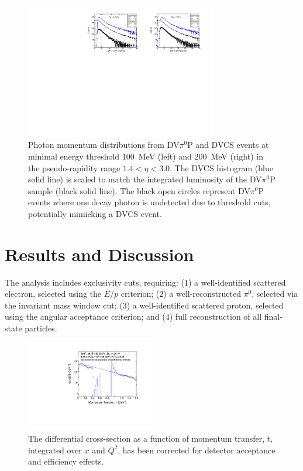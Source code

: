 \documentclass[letterpaper,12pt]{article}
\begin{document}
\begin{figure}[h]
    \centering
    \includegraphics[width=0.75\textwidth]{Figures/hGammasMomMC2DVCS.pdf}
    \caption{Photon momentum distributions from DV$\pi^{0}$P and DVCS events at minimal energy threshold 100~MeV (left) and 200~MeV (right) in the pseudo-rapidity range $1.4 < \eta < 3.0$. The DVCS histogram (blue solid line) is scaled to match the integrated luminosity of the DV$\pi^{0}$P sample (black solid line). The black open circles represent DV$\pi^{0}$P events where one decay photon is undetected due to threshold cuts, potentially mimicking a DVCS event.}
\label{fig:gamma_dist}
\end{figure}

\pagebreak
\section{Results and Discussion}\label{sec:Results_Discuss}
The analysis includes exclusivity cuts, requiring: (1) a well-identified scattered electron, selected using the $E/p$ criterion; (2) a well-reconstructed $\pi^{0}$, selected via the invariant mass window cut; (3) a well-identified scattered proton, selected using the angular acceptance criterion; and (4) full reconstruction of all final-state particles.

\begin{figure}[hb]
    \centering
    \includegraphics[width=0.5\textwidth]{Figures/t_distribution_corrected_sigma.pdf}
    \caption{The differential cross-section as a function of momentum transfer, $t$, integrated over $x$ and $Q^{2}$, has been corrected for detector acceptance and efficiency effects.}
\label{fig:tdist}
\end{figure}
\end{document}
